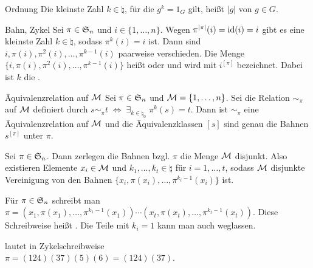 \begin{Def}{Ordnung}
    Die kleinste Zahl $k \in \natural$, für die $g^k = 1_G$ gilt,
    heißt  $|g|$ von $g \in G$.
\end{Def}

\begin{Def}{Bahn, Zykel}
    Sei $\pi \in \mathfrak{S}_n$ und $i \in \{1, \dotsc, n\}$.
    Wegen $\pi^{|\pi|}(i) = \operatorname{id}(i) = i$ gibt es eine kleinste Zahl
    $k \in \natural$, sodass $\pi^k(i) = i$ ist.
    Dann sind $i, \pi(i), \pi^2(i), \dotsc, \pi^{k-1}(i)$ paarweise
    verschieden.
    Die Menge $\{i, \pi(i), \pi^2(i), \dotsc, \pi^{k-1}(i)\}$ heißt
     oder  und wird mit
    $i^{[\pi]}$ bezeichnet.
    Dabei ist $k$ die .
\end{Def}

\begin{Lemma}{Äquivalenzrelation auf $\mathcal{M}$}
    Sei $\pi \in \mathfrak{S}_n$ und $\mathcal{M} = \{1, \dotsc, n\}$.
    Sei die Relation $\sim_\pi$ auf $\mathcal{M}$ definiert durch
    $s \sim_\pi t \;\Leftrightarrow\;
    \exists_{k \in \natural_0}\; \pi^k(s) = t$.
    Dann ist $\sim_\pi$ eine Äquivalenzrelation auf $\mathcal{M}$ und die
    Äquivalenzklassen $[s]$ sind genau die Bahnen $s^{[\pi]}$ unter $\pi$.
\end{Lemma}

\begin{Kor}
    Sei $\pi \in \mathfrak{S}_n$.
    Dann zerlegen die Bahnen bzgl. $\pi$ die Menge $\mathcal{M}$ disjunkt.
    Also existieren Elemente $x_i \in \mathcal{M}$
    und $k_1, \dotsc, k_t \in \natural$ für $i = 1, \dotsc, t$, sodass
    $\mathcal{M}$ disjunkte Vereinigung von den Bahnen
    $\{x_i, \pi(x_i), \dotsc, \pi^{k_i-1}(x_i)\}$ ist.
\end{Kor}

\begin{Notation}
    Für $\pi \in \mathfrak{S}_n$ schreibt man
    $\pi = (x_1, \pi(x_1), \dotsc, \pi^{k_1-1}(x_1)) \dotsm
    (x_t, \pi(x_t), \dotsc, \pi^{k_t-1}(x_t))$.
    Diese Schreibweise heißt .
    Die Teile mit $k_i = 1$ kann man auch weglassen.
\end{Notation}

\begin{Bem}
     lautet in Zykelschreibweise\\
    $\pi = (124)(37)(5)(6) = (124)(37)$.
\end{Bem}

